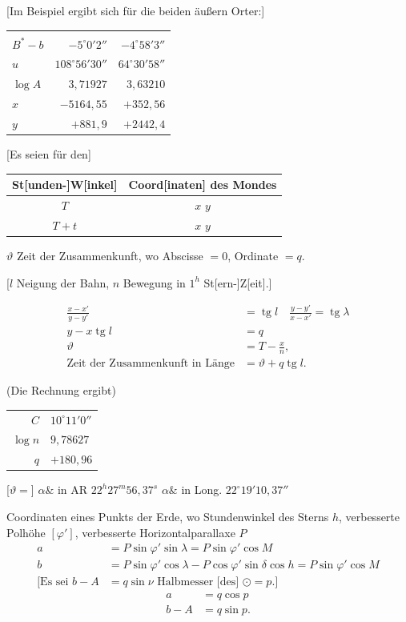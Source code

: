 \documentclass[12pt,a4paper]{article}
\theoremstyle{plain}
\theoremstyle{definition}
\theoremstyle{remark}
\DeclareMathOperator{\tg}{tg}
\begin{document}
\newpage

[Im Beispiel ergibt sich f\"ur die beiden \"au\ss ern Orter:]

\begin{center}
\begin{tabular}{l@{\quad}r@{\quad}r}
& & \\
$B^* - b$ & $-5^{\circ}0'2''$ & $-4^{\circ}58'3''$ \\
$u$ & $108^{\circ}56'30''$ & $64^{\circ}30'58''$ \\
$\log A$ & $3{,}71927$ & $3{,}63210$ \\
$x$ & $-5164{,}55$ & $+352{,}56$ \\
$y$ & $+881{,}9$ & $+2442{,}4$
\end{tabular}
\end{center}

[Es seien f\"ur den]
\begin{center}
\begin{tabular}{c|c}
St[unden-]W[inkel] & Coord[inaten] des Mondes \\
\hline
$T$ & $x$ \quad\quad $y$ \\
$T+t$ & $x$ \quad\quad $y$
\end{tabular}
\end{center}

$\vartheta$ Zeit der Zusammenkunft, wo Abscisse $= 0$, Ordinate $= q$.

[$l$ Neigung der Bahn, $n$ Bewegung in $1^h$ St[ern-]Z[eit].]

\begin{align}
\tfrac{x - x'}{y - y'} &= \tg l \quad \tfrac{y - y'}{x - x'} = \tg\lambda \\
y - x\tg l &= q \\
\vartheta &= T - \tfrac{x}{n}, \\
\text{Zeit der Zusammenkunft in L\"ange} &= \vartheta + q\tg l.
\end{align}

(Die Rechnung ergibt)
\begin{center}
\begin{tabular}{r@{ $=$ }l}
$C$ & $10^{\circ}11'0''$ \\
$\log n$ & $9{,}78627$ \\
$q$ & $+180{,}96$
\end{tabular}
\end{center}
[$\vartheta =$] $\alpha\!\!\&$ in AR $22^h27^m56{,}37^s$ \quad $\alpha\!\!\&$ in Long. $22^{\circ}19'10{,}37''$

Coordinaten eines Punkts der Erde, wo Stundenwinkel des Sterns $h$, verbesserte Polh\"ohe $[\varphi']$, verbesserte Horizontalparallaxe $P$
\begin{align}
a &= P\sin\varphi'\sin\lambda = P\sin\varphi'\cos M \\
b &= P\sin\varphi'\cos\lambda - P\cos\varphi'\sin\delta\cos h = P\sin\varphi'\cos M \\
\text{[Es sei } b - A &= q\sin\nu \text{ Halbmesser [des] } \odot = p.]
\end{align}
\begin{align}
a &= q\cos p \\
b - A &= q\sin p.
\end{align}
\end{document}

